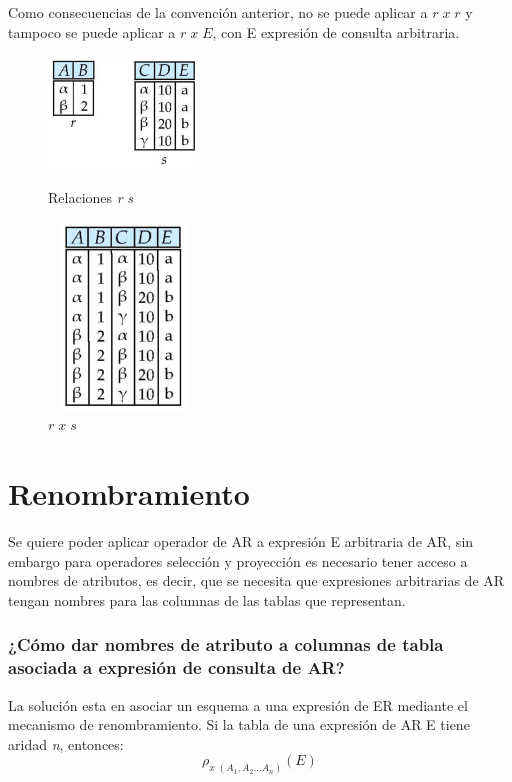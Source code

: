 \documentclass[12pt,a4paper]{report}
\begin{document}
		\par Como consecuencias de la convención anterior, no se puede aplicar a $r \; x \; r$ y tampoco se puede aplicar a $r \; x \; E$, con E expresión de consulta arbitraria.
		
			\begin{figure}[htb]
				\centering
				\includegraphics[width=4cm, height=3cm]{./imagenes/pc1.png}
				\caption{Relaciones \textit{r} \textit{s}}
				\vspace{5mm}
				\includegraphics[width=4cm, height=5cm]{./imagenes/pc2.png}
				\caption{$r \; x \; s$}
			\end{figure}
		
	\section{Renombramiento}
		\par Se quiere poder aplicar operador de AR a expresión E arbitraria de AR, sin embargo para operadores selección y proyección es necesario tener acceso a nombres de atributos, es decir, que se necesita que expresiones arbitrarias de AR tengan nombres para las columnas de las tablas que representan.

		\subsubsection{¿Cómo dar nombres de atributo a columnas de tabla asociada a expresión de consulta de AR?}
			\par La solución esta en asociar un esquema a una expresión de ER mediante el mecanismo de renombramiento. Si la tabla de una expresión de AR E tiene aridad \textit{n}, entonces:
			\[ \rho_{x \; (A_{1}, A_{2} \dotsc A_{n})}(E)\]
\end{document}
